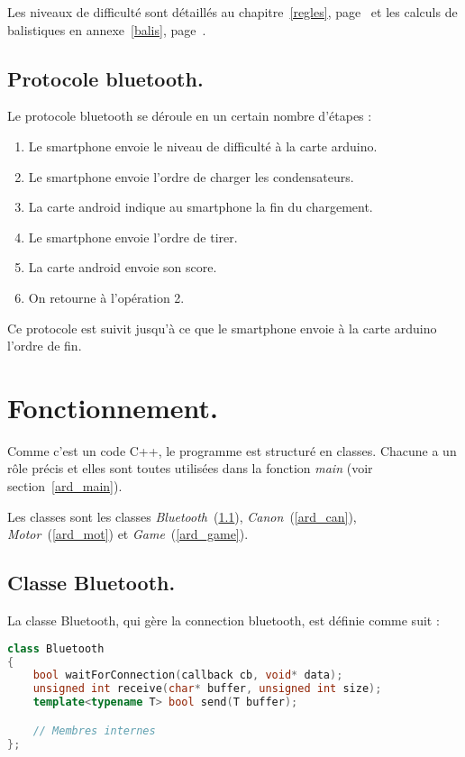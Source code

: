 Les niveaux de difficulté sont détaillés au chapitre~\ref{regles}, page~\pageref{regles} et les calculs de balistiques en annexe~\ref{balis}, page~\pageref{balis}.

\subsection{Protocole bluetooth.} \label{prot_bt}
Le protocole bluetooth se déroule en un certain nombre d'étapes :\begin{enumerate} %
	\item Le smartphone envoie le niveau de difficulté à la carte arduino.
	\item Le smartphone envoie l'ordre de charger les condensateurs.
	\item La carte android indique au smartphone la fin du chargement.
	\item Le smartphone envoie l'ordre de tirer.
	\item La carte android envoie son score.
	\item On retourne à l'opération 2.
\end{enumerate}

Ce protocole est suivit jusqu'à ce que le smartphone envoie à la carte arduino l'ordre de fin.

\section{Fonctionnement.}
Comme c'est un code C++, le programme est structuré en classes. Chacune a un rôle précis et elles sont toutes utilisées dans la fonction \emph{main} (voir section~\ref{ard_main}).

Les classes sont les classes \emph{Bluetooth}~(\ref{ard_bt}), \emph{Canon}~(\ref{ard_can}), \emph{Motor}~(\ref{ard_mot}) et \emph{Game}~(\ref{ard_game}).

\subsection{Classe Bluetooth.} \label{ard_bt}
La classe Bluetooth, qui gère la connection bluetooth, est définie comme suit :
\begin{lstlisting}[language=C++]
class Bluetooth
{
	bool waitForConnection(callback cb, void* data);
	unsigned int receive(char* buffer, unsigned int size);
	template<typename T> bool send(T buffer);

	// Membres internes
};
\end{lstlisting}

